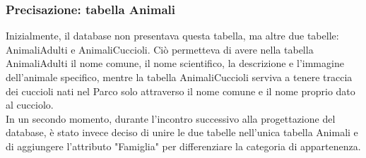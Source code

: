	\subsubsection{Precisazione: tabella Animali}
	Inizialmente, il database non presentava questa tabella, ma altre due tabelle: AnimaliAdulti e AnimaliCuccioli. Ciò permetteva di avere nella tabella AnimaliAdulti il nome comune, il nome scientifico, la descrizione e l'immagine dell'animale specifico, mentre la tabella AnimaliCuccioli serviva a tenere traccia dei cuccioli nati  nel Parco solo attraverso il nome comune e il nome proprio dato al cucciolo.\\
	In un secondo momento, durante l'incontro successivo alla progettazione del database, è stato invece deciso di unire le due tabelle nell'unica tabella Animali e di aggiungere l'attributo "Famiglia" per differenziare la categoria di appartenenza.
\pagebreak